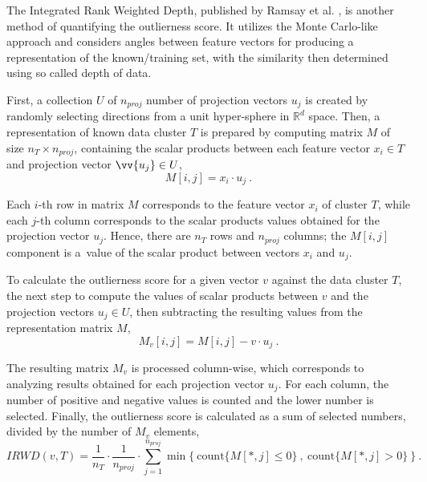 The Integrated Rank Weighted Depth, published by Ramsay et al. \cite{Ramsay-2019}, is another method of quantifying the outlierness score. It utilizes the Monte Carlo-like approach and considers angles between feature vectors for producing a representation of the known/training set, with the similarity then determined using so called depth of data.

First, a collection $U$ of $n_{proj}$ number of projection vectors $u_j$ is created by randomly selecting directions from a unit hyper-sphere in $\mathbb{R}^d$ space. Then, a representation of known data cluster $T$ is prepared by computing matrix $M$ of size $n_{T} \times n_{proj}$, containing the scalar products between each feature vector $x_i \in T$ and projection vector $\vv{u_j} \in U$,
\begin{equation}
    M[i, j] = x_i \cdot u_j
    ~.
    \label{eq:irwd-M}
\end{equation}

Each $i$-th row in matrix $M$ corresponds to the feature vector $x_i$ of cluster $T$, while each $j$-th column corresponds to the scalar products values obtained for the projection vector $u_j$. Hence, there are $n_{T}$ rows and $n_{proj}$ columns; the $M[i, j]$ component is a~value of the scalar product between vectors $x_i$ and $u_j$.

To calculate the outlierness score for a given vector $v$ against the data cluster $T$, the next step to compute the values of scalar products between $v$ and the projection vectors $u_j \in U$, then subtracting the resulting values from the representation matrix $M$,
\begin{equation}
    M_v[i, j] = M[i, j] - v \cdot u_j
    ~.
    \label{eq:irwd-M_v}
\end{equation}

The resulting matrix $M_v$ is processed column-wise, which corresponds to analyzing results obtained for each projection vector $u_j$. For each column, the number of positive and negative values is counted and the lower number is selected. Finally, the outlierness score is calculated as a sum of selected numbers, divided by the number of $M_v$ elements,
\begin{equation}
    IRWD(v, T)
    =
    \frac{1}{n_{T}}
    \cdot
    \frac{1}{n_{proj}}
    \cdot
    \sum_{j=1}^{n_{proj}}
    \min\big\{
        ~
        \mathrm{count}\{M[*,j] \le 0\}
        ~,~
        \mathrm{count}\{M[*,j] > 0\}
        ~
    \big\}
    ~.
    \label{eq:irwd}
\end{equation}

